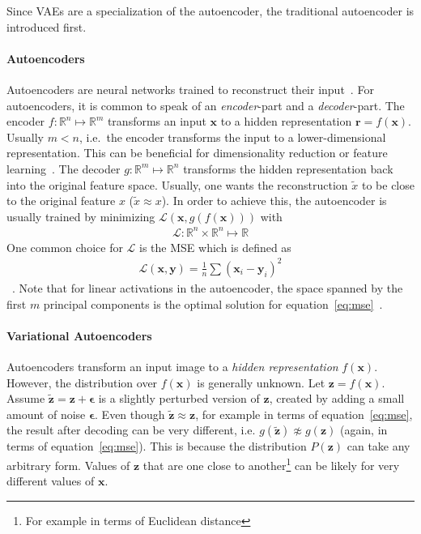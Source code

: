 Since \acfp{VAE} are a specialization of the autoencoder, the traditional autoencoder is introduced first.

\paragraph{Autoencoders}

Autoencoders are neural networks trained to reconstruct their input~\citep[p. 499]{Goodfellow-et-al-2016}.
For autoencoders, it is common to speak of an \textit{encoder}-part and a \textit{decoder}-part.
The encoder $f: \mathbb{R}^n \mapsto \mathbb{R}^m$ transforms an input $\bm{x}$ to a hidden representation $\bm{r} = f(\bm{x})$.
Usually $m < n$, i.e.\ the encoder transforms the input to a lower-dimensional representation.
This can be beneficial for dimensionality reduction or feature learning~\citep[p. 499]{Goodfellow-et-al-2016}.
The decoder $g: \mathbb{R}^m \mapsto \mathbb{R}^n$ transforms the hidden representation back into the original feature space.
Usually, one wants the reconstruction $\tilde{x}$ to be close to the original feature $x$ ($\tilde{x} \approx x$).
In order to achieve this, the autoencoder is usually trained by minimizing $\mathcal{L}(\bm{x}, g(f(\bm{x})))$ with
\begin{align}
    \mathcal{L}: \mathbb{R}^n \times \mathbb{R}^n \mapsto \mathbb{R}
\end{align}
One common choice for $\mathcal{L}$ is the \ac{MSE} which is defined as
\begin{align}
    \mathcal{L}(\bm{x}, \bm{y}) = \frac{1}{n}\sum (\bm{x}_i - \bm{y}_i)^2 \label{eq:mse}
\end{align}~\citep[p. 106]{Goodfellow-et-al-2016}.
Note that for linear activations in the autoencoder, the space spanned by the first $m$ principal components is the optimal solution for equation~\ref{eq:mse}~\citep{chicco2014deep}.

\paragraph{Variational Autoencoders}

Autoencoders transform an input image to a \textit{hidden representation} $f(\bm{x})$.
However, the distribution over $f(\bm{x})$ is generally unknown.
Let $\bm{z} = f(\bm{x})$.
Assume $\bm{\tilde{z}} = \bm{z} + \bm{\epsilon}$ is a slightly perturbed version of $\bm{z}$, created by adding a small amount of noise $\bm{\epsilon}$.
Even though $\bm{\tilde{z}} \approx \bm{z}$, for example in terms of equation~\ref{eq:mse}, the result after decoding can be very different, i.e. $g(\bm{\tilde{z}}) \not\approx g(\bm{z})$ (again, in terms of equation~\ref{eq:mse}).
This is because the distribution $P(\bm{z})$ can take any arbitrary form.
Values of $\bm{z}$ that are one close to another\footnote{For example in terms of Euclidean distance} can be likely for very different values of $\bm{x}$.

